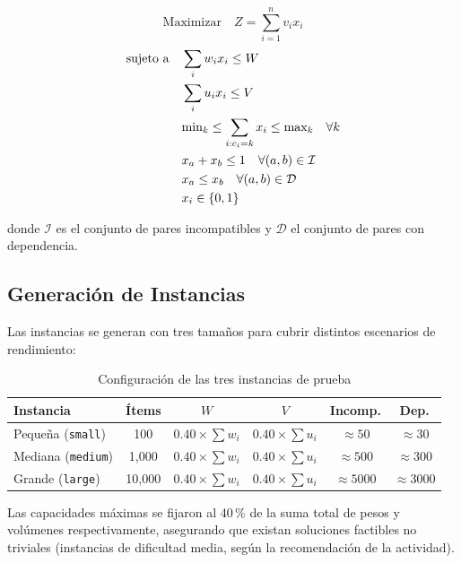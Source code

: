 \begin{equation}
  \text{Maximizar} \quad Z = \sum_{i=1}^{n} v_i x_i
\end{equation}
\begin{align}
  \text{sujeto a} \quad &\sum_{i} w_i x_i \leq W \notag\\
                        &\sum_{i} u_i x_i \leq V \notag\\
                        &\text{min}_k \leq \sum_{i: c_i=k} x_i \leq \text{max}_k \quad \forall k \notag\\
                        &x_a + x_b \leq 1 \quad \forall (a,b) \in \mathcal{I} \notag\\
                        &x_a \leq x_b \quad \forall (a,b) \in \mathcal{D} \notag\\
                        &x_i \in \{0,1\} \notag
\end{align}

donde $\mathcal{I}$ es el conjunto de pares incompatibles y $\mathcal{D}$ el conjunto de
pares con dependencia.

\subsection{Generación de Instancias}

Las instancias se generan con tres tamaños para cubrir distintos escenarios de rendimiento:

\begin{table}[H]
  \centering
  \caption{Configuración de las tres instancias de prueba}
  \label{tab:instancias}
  \begin{tabular}{lccccc}
    \toprule
    \textbf{Instancia} & \textbf{Ítems} & \textbf{$W$} & \textbf{$V$} &
    \textbf{Incomp.} & \textbf{Dep.} \\
    \midrule
    Pequeña (\texttt{small})  & 100    &
      $0.40 \times \sum w_i$ & $0.40 \times \sum u_i$ & $\approx50$  & $\approx30$  \\
    Mediana (\texttt{medium}) & 1,000  &
      $0.40 \times \sum w_i$ & $0.40 \times \sum u_i$ & $\approx500$ & $\approx300$ \\
    Grande (\texttt{large})   & 10,000 &
      $0.40 \times \sum w_i$ & $0.40 \times \sum u_i$ & $\approx5000$& $\approx3000$\\
    \bottomrule
  \end{tabular}
\end{table}

Las capacidades máximas se fijaron al 40\,\% de la suma total de pesos y volúmenes
respectivamente, asegurando que existan soluciones factibles no triviales (instancias de
dificultad media, según la recomendación de la actividad).